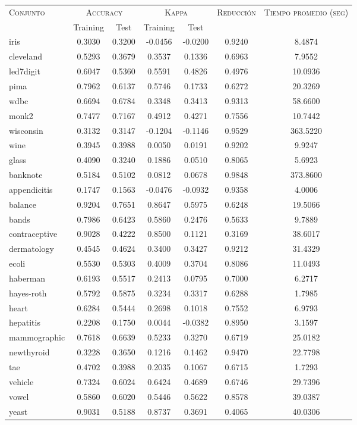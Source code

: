 \begin{table}[]
\centering
\begin{tabular}{l c c c c c c}
\hline
\multirow{2}{*}{\textsc{Conjunto}}
	& \multicolumn{2}{c}{\textsc{Accuracy}}
	& \multicolumn{2}{c}{\textsc{Kappa}}
	& \textsc{Reducción}
	& \textsc{Tiempo promedio (seg)} \\
	& Training & Test
	& Training & Test \\ 
\hline
\hline

iris & 0.3030 & 0.3200 & -0.0456 & -0.0200 & 0.9240 & 8.4874 \\
cleveland & 0.5293 & 0.3679 & 0.3537 & 0.1336 & 0.6963 & 7.9552 \\
led7digit & 0.6047 & 0.5360 & 0.5591 & 0.4826 & 0.4976 & 10.0936 \\
pima & 0.7962 & 0.6137 & 0.5746 & 0.1733 & 0.6272 & 20.3269 \\
wdbc & 0.6694 & 0.6784 & 0.3348 & 0.3413 & 0.9313 & 58.6600 \\
monk2 & 0.7477 & 0.7167 & 0.4912 & 0.4271 & 0.7556 & 10.7442 \\
wisconsin & 0.3132 & 0.3147 & -0.1204 & -0.1146 & 0.9529 & 363.5220 \\
wine & 0.3945 & 0.3988 & 0.0050 & 0.0191 & 0.9202 & 9.9247 \\
glass & 0.4090 & 0.3240 & 0.1886 & 0.0510 & 0.8065 & 5.6923 \\
banknote & 0.5184 & 0.5102 & 0.0812 & 0.0678 & 0.9848 & 373.8600 \\
appendicitis & 0.1747 & 0.1563 & -0.0476 & -0.0932 & 0.9358 & 4.0006 \\
balance & 0.9204 & 0.7651 & 0.8647 & 0.5975 & 0.6248 & 19.5066 \\
bands & 0.7986 & 0.6423 & 0.5860 & 0.2476 & 0.5633 & 9.7889 \\
contraceptive & 0.9028 & 0.4222 & 0.8500 & 0.1121 & 0.3169 & 38.6017 \\
dermatology & 0.4545 & 0.4624 & 0.3400 & 0.3427 & 0.9212 & 31.4329 \\
ecoli & 0.5530 & 0.5303 & 0.4009 & 0.3704 & 0.8086 & 11.0493 \\
haberman & 0.6193 & 0.5517 & 0.2413 & 0.0795 & 0.7000 & 6.2717 \\
hayes-roth & 0.5792 & 0.5875 & 0.3234 & 0.3317 & 0.6288 & 1.7985 \\
heart & 0.6284 & 0.5444 & 0.2698 & 0.1018 & 0.7552 & 6.9793 \\
hepatitis & 0.2208 & 0.1750 & 0.0044 & -0.0382 & 0.8950 & 3.1597 \\
mammographic & 0.7618 & 0.6639 & 0.5233 & 0.3270 & 0.6719 & 25.0182 \\
newthyroid & 0.3228 & 0.3650 & 0.1216 & 0.1462 & 0.9470 & 22.7798 \\
tae & 0.4702 & 0.3988 & 0.2035 & 0.1067 & 0.6715 & 1.7293 \\
vehicle & 0.7324 & 0.6024 & 0.6424 & 0.4689 & 0.6746 & 29.7396 \\
vowel & 0.5860 & 0.6020 & 0.5446 & 0.5622 & 0.8578 & 39.0387 \\
yeast & 0.9031 & 0.5188 & 0.8737 & 0.3691 & 0.4065 & 40.0306 \\


\end{tabular}
\end{table}
